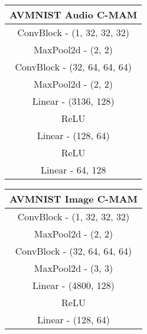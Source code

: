 \begin{table}[h!]
\begin{minipage}[t]{0.44\textwidth}
\begin{tabular}{clllllclllll}
        \end{tabular}
    \end{minipage}%
    \hfill
    \begin{minipage}[t]{0.19\textwidth}
    \centering
    \vspace{0pt} %
        \begin{tabular}{|clllll|}
        \hline
        \multicolumn{6}{c}{\textbf{AVMNIST Audio C-MAM}} \\ \hline
            \multicolumn{6}{c}{ConvBlock - (1, 32, 32, 32)}                     \\ \hline
            \multicolumn{6}{c}{MaxPool2d - (2, 2)}                       \\ \hline
            \multicolumn{6}{c}{ConvBlock - (32, 64, 64, 64)}                     \\ \hline
            \multicolumn{6}{c}{MaxPool2d - (2, 2)}                        \\ \hline
            \multicolumn{6}{c}{Linear - (3136, 128)}                        \\ \hline
            \multicolumn{6}{c}{ReLU}                        \\ \hline
            \multicolumn{6}{c}{Linear - (128, 64)}                        \\ \hline
            \multicolumn{6}{c}{ReLU}                        \\ \hline
            \multicolumn{6}{c}{Linear - {64, 128}}\\ \hline
        \end{tabular}
    \end{minipage}%
    \hfill
    \begin{minipage}[t]{0.2\textwidth}
    \centering
    \vspace{0pt} %
        \begin{tabular}{|clllll|}
        \hline
        \multicolumn{6}{c}{\textbf{AVMNIST Image C-MAM}} \\ \hline
        \multicolumn{6}{c}{ConvBlock - (1, 32, 32, 32)}                     \\ \hline
        \multicolumn{6}{c}{MaxPool2d - (2, 2)}                       \\ \hline
        \multicolumn{6}{c}{ConvBlock - (32, 64, 64, 64)}                     \\ \hline
        \multicolumn{6}{c}{MaxPool2d - (3, 3)}                        \\ \hline
        \multicolumn{6}{c}{Linear - (4800, 128)}                   \\ \hline
        \multicolumn{6}{c}{ReLU}                   \\ \hline
        \multicolumn{6}{c}{Linear - (128, 64)}                   \\ \hline
        \end{tabular}
    \end{minipage}%
    \hfill
\end{table}
